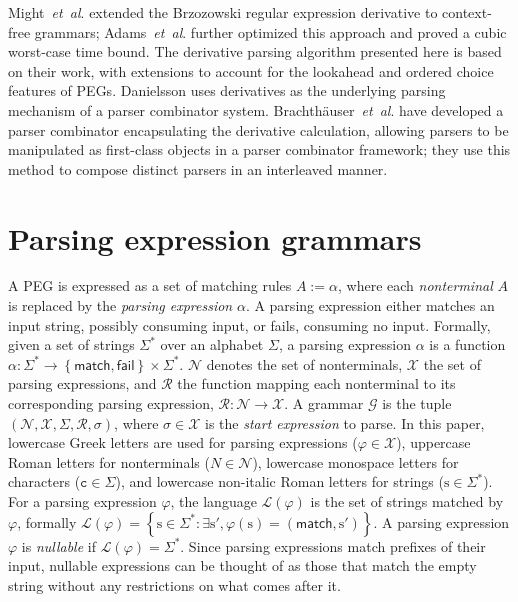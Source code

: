 \documentclass[submission,copyright,creativecommons]{eptcs}
\newcommand{\match}{\mathsf{match}}
\newcommand{\fail}{\mathsf{fail}}
\newcommand{\Rule}{\mathcal{R}}
\newcommand{\NonT}{\mathcal{N}}
\newcommand{\Expr}{\mathcal{X}}
\newcommand{\Lang}{\mathcal{L}}
\newcommand{\str}{\mathrm{s}}
\newcommand{\chs}[1]{\mathtt{#1}}
\newcommand{\etal}{\textit{et~al}. }
\begin{document}
Might~\etal \cite{MDS11} extended the Brzozowski regular expression derivative \cite{Brz64} to context-free grammars; Adams~\etal \cite{AHM16} further optimized this approach and proved a cubic worst-case time bound. 
The derivative parsing algorithm presented here is based on their work, with extensions to account for the lookahead and ordered choice features of PEGs.
Danielsson \cite{Dan10} uses derivatives as the underlying parsing mechanism of a parser combinator system.
Brachth\"{a}user~\etal \cite{BRO16} have developed a parser combinator encapsulating the derivative calculation, allowing parsers to be manipulated as first-class objects in a parser combinator framework; they use this method to compose distinct parsers in an interleaved manner.

\section{Parsing expression grammars}
\label{background-sec}

A PEG is expressed as a set of matching rules $A := \alpha$, where each \emph{nonterminal} $A$ is replaced by the \emph{parsing expression} $\alpha$. 
A parsing expression either matches an input string, possibly consuming input, or fails, consuming no input. 
Formally, given a set of strings $\Sigma^*$ over an alphabet $\Sigma$, a parsing expression $\alpha$ is a function $\alpha: \Sigma^* \rightarrow \left\lbrace \match, \fail \right\rbrace \times \Sigma^*$. 
$\NonT$ denotes the set of nonterminals, $\Expr$ the set of parsing expressions, and $\Rule$ the function mapping each nonterminal to its corresponding parsing expression, $\Rule: \NonT \rightarrow \Expr$. 
A grammar $\mathcal{G}$ is the tuple $(\NonT, \Expr, \Sigma, \Rule, \sigma)$, where $\sigma \in \Expr$ is the \emph{start expression} to parse. 
In this paper, lowercase Greek letters are used for parsing expressions ($\varphi \in \Expr$), uppercase Roman letters for nonterminals ($N \in \NonT$), lowercase monospace letters for characters ($\chs{c} \in \Sigma$), and lowercase non-italic Roman letters for strings ($\str \in \Sigma^*$).
For a parsing expression $\varphi$, the language $\Lang(\varphi)$ is the set of strings matched by $\varphi$, formally $\Lang(\varphi) = \left\lbrace \str \in \Sigma^* : \exists \str', \varphi(\str) = \left(\match, \str'\right) \right\rbrace$. 
A parsing expression $\varphi$ is \emph{nullable} if $\Lang(\varphi) = \Sigma^*$. 
Since parsing expressions match prefixes of their input, nullable expressions can be thought of as those that match the empty string without any restrictions on what comes after it.
\end{document}
